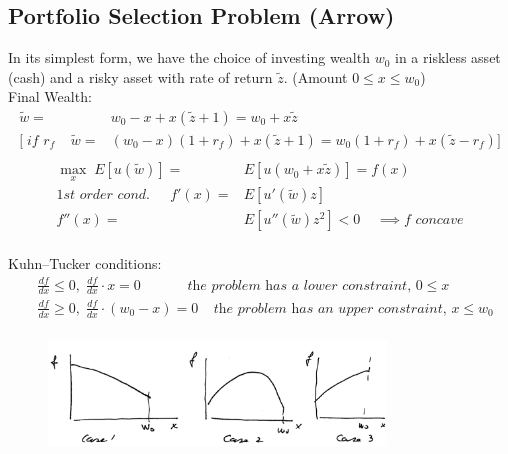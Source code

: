 \documentclass[
14pt,notheorems,hyperref={pdfauthor=whatever}
]{beamer}
\begin{document}
\subsection{Portfolio Selection Problem (Arrow)}
\begin{frame}
In its simplest form, we have the choice of investing wealth $w_0$ in a riskless asset (cash) and a risky asset with rate of return $\tilde z$. (Amount $0 \leq x \leq w_0$)\\
\hfill \break
Final Wealth:
\begin{align*}
    \tilde w =& w_0-x + x(\tilde z+1) = w_0 + x\tilde z\\
    \Bigg[\;\textit{if $r_f$}\;\;\;\; \tilde w =& (w_0-x)(1+r_f)+x(\tilde z+1) = w_0(1+r_f) + x(\tilde z - r_f) \Bigg]\\
\end{align*}
\begin{align*}
    \max_x \; E[u(\tilde w)] =& E[u(w_0+x\tilde z)] = f(x)\\
    \textit{1st order cond. }\;\;\;\; f'(x) =& E[u'(\tilde w)z]\\
    f''(x) =& E[u''(\tilde w)z^2] < 0 \;\;\;\;\implies f \textit{ concave}\\
\end{align*}
\end{frame}

\begin{frame}
Kuhn–Tucker conditions:
\begin{align*}
    &\frac{df}{dx} \boldsymbol\leq 0,\;\frac{df}{dx}\cdot x=0 \;\;\;\;\;\;\;\;\;\;\;\;\textit{the problem has a lower constraint, $0\leq x$}\\
    &\frac{df}{dx} \boldsymbol\geq 0,\;\frac{df}{dx}\cdot (w_0-x)=0 \;\;\;\;\textit{the problem has an upper constraint, $x\leq w_0$}\\
\end{align*}
\begin{figure}[threecases]
    \includegraphics[width=0.8\textwidth]{L4-three-cases.png}
    \centering
\end{figure}
\end{frame}
\end{document}
